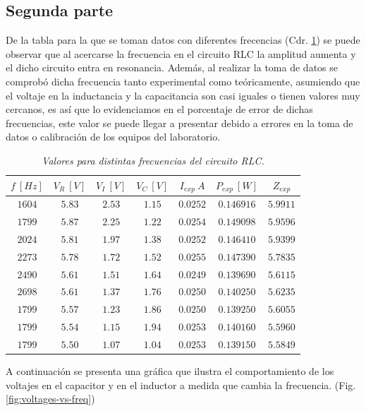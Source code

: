 \documentclass[spanish,notitlepage,letterpaper, 12pt]{article}
\begin{document}
\subsection{Segunda parte}
De la tabla para la que se toman datos con diferentes frecencias (Cdr. \ref{tab:var-freq}) se puede observar que al acercarse la frecuencia en el circuito RLC la amplitud aumenta y el dicho circuito entra en resonancia. Además, al realizar la toma de datos se comprobó dicha frecuencia tanto
experimental como teóricamente, asumiendo que el voltaje en la inductancia y la capacitancia son casi iguales o tienen valores muy cercanos, es así que lo evidenciamos en el porcentaje de error de dichas frecuencias, este valor se puede llegar a presentar debido a errores en la toma de datos o
calibración de los equipos del laboratorio.\par
\begin{table}[ht]
    \centering
    \begin{tabular}{|c|c|c|c|c|c|c|}
        \hline
        $f\ [Hz]$ & $V_R\ [V]$ & $V_I\ [V]$ & $V_C\ [V]$ & $I_{exp}\ A$ & $P_{exp}\ [W]$ & $Z_{exp}$\\
        \hline\hline
        $1604$ & $5.83$ & $2.53$ & $1.15$ & $0.0252$ & $0.146916$ & $5.9911$\\
        $1799$ & $5.87$ & $2.25$ & $1.22$ & $0.0254$ & $0.149098$ & $5.9596$\\
        $2024$ & $5.81$ & $1.97$ & $1.38$ & $0.0252$ & $0.146410$ & $5.9399$\\
        $2273$ & $5.78$ & $1.72$ & $1.52$ & $0.0255$ & $0.147390$ & $5.7835$\\
        $2490$ & $5.61$ & $1.51$ & $1.64$ & $0.0249$ & $0.139690$ & $5.6115$\\
        $2698$ & $5.61$ & $1.37$ & $1.76$ & $0.0250$ & $0.140250$ & $5.6235$\\
        $1799$ & $5.57$ & $1.23$ & $1.86$ & $0.0250$ & $0.139250$ & $5.6055$\\
        $1799$ & $5.54$ & $1.15$ & $1.94$ & $0.0253$ & $0.140160$ & $5.5960$\\
        $1799$ & $5.50$ & $1.07$ & $1.04$ & $0.0253$ & $0.139150$ & $5.5849$\\
        \hline
    \end{tabular}
    \caption{\textit{Valores para distintas frecuencias del circuito RLC.}}
    \label{tab:var-freq}
\end{table}
A continuación se presenta una gráfica que ilustra el comportamiento de los voltajes en el capacitor y en el inductor a medida que cambia la frecuencia. (Fig. \ref{fig:voltages-vs-freq})\par
\end{document}
